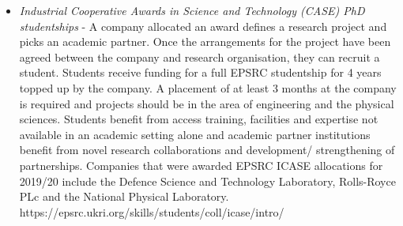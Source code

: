 \documentclass[11pt]{article} %
\begin{document}
	\begin{itemize}
		\item \textit{Industrial Cooperative Awards in Science and Technology (CASE) PhD studentships }- A company allocated an award defines a research project and picks an academic partner. Once the arrangements for the project have been agreed between the company and research organisation, they can recruit a student. Students receive funding for a full EPSRC studentship for 4 years topped up by the company. A placement of at least 3 months at the company is required and projects should be in the area of engineering and the physical sciences. Students benefit from access training, facilities and expertise not available in an academic setting alone and academic partner institutions benefit from novel research collaborations and  development/ strengthening  of partnerships. Companies that were awarded EPSRC ICASE allocations for 2019/20 include the Defence Science and Technology Laboratory, Rolls-Royce PLc and the National Physical Laboratory. https://epsrc.ukri.org/skills/students/coll/icase/intro/
		

\end{itemize}
\end{document}
